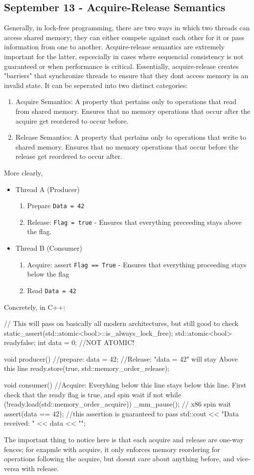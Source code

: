 \documentclass[11pt, a4paper]{article}
\theoremstyle{definition}
\theoremstyle{remark}
\begin{document}
\subsection{September 13 - Acquire-Release Semantics}
Generally, in lock-free programming, there are two ways in which two threads can access shared memory; they can either compete against each other for it or
pass information from one to another. Acquire-release semantics are extremely important for the latter, espcecially in cases where sequencial consistency is not guaranteed or when performance is critical. Essentially, acquire-release 
creates "barriers" that synchronize threads to ensure that they dont access memory in an invalid state. It can be seperated into two distinct categories:
\begin{enumerate}
  \item Acquire Semantics: A property that pertains only to operations that read from shared memory. Ensures that no memory operations that occur after the acquire get reordered to occur before.
  \item Release Semantics: A property that pertains only to operations that write to shared memory. Ensures that no memory operations that occur before the release get reordered to occur after.
\end{enumerate}
More clearly,
\begin{itemize}
  \item Thread A (Producer)
  \begin{enumerate}
    \item Prepare  \lstinline|Data = 42|
    \item Release: \lstinline|Flag = true| - Ensures that everything preceeding stays above the flag.
  \end{enumerate}
  \item Thread B (Consumer)
  \begin{enumerate}
    \item Acquire: assert \lstinline|Flag == True| - Ensures that everything proceeding stays below the flag
    \item Read \lstinline|Data = 42|
  \end{enumerate}
\end{itemize}
\newpage
Concretely, in C++:
\begin{cppcode}
// This will pass on basically all modern architectures, but still good to check
static_assert(std::atomic<bool>::is_always_lock_free); 
std::atomic<bool> ready{false};
int data = 0; //NOT ATOMIC!

void producer() {
  //prepare:
  data = 42;
  //Release: "data = 42" will stay Above this line
  ready.store(true, std::memory_order_release);
}

void consumer() {
  //Acquire: Everyhing below this line stays below this line. First check that the ready flag is true, and spin wait if not
  while (!ready.load(std::memory_order_acquire)) {
    _mm_pause(); // x86 spin wait
  }
  assert(data == 42); //this assertion is guaranteed to pass
  std::cout << "Data received: " << data << "\n";
}
\end{cppcode}
The important thing to notice here is that each acquire and release are one-way fences; for exapmle with acquire, it only enforces memory reordering for operations following the acquire, but doesnt care about anything before, and vice-versa with release. 
\end{document}
